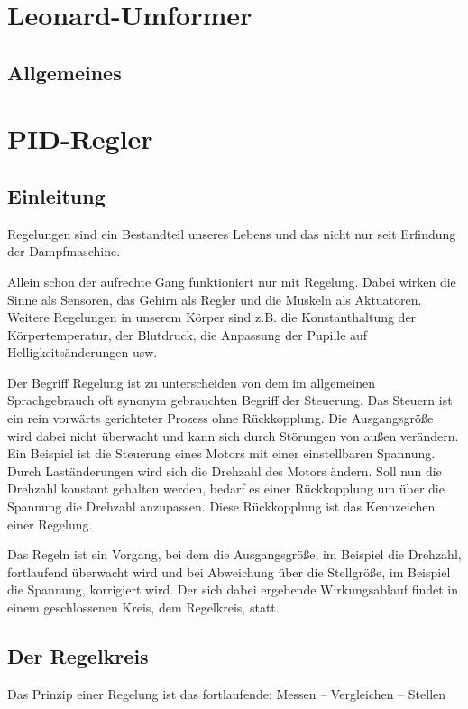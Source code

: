 \section{Leonard-Umformer}
\subsection{Allgemeines}
\subsection{ }

\newpage

\section{PID-Regler}
\subsection{Einleitung}
Regelungen sind ein Bestandteil unseres Lebens und das nicht nur seit Erfindung der Dampfmaschine.

Allein schon der aufrechte Gang funktioniert nur mit Regelung. Dabei wirken die Sinne als Sensoren, das Gehirn als Regler und die Muskeln als Aktuatoren. Weitere Regelungen in unserem Körper sind z.B. die Konstanthaltung der Körpertemperatur, der Blutdruck, die Anpassung der Pupille auf Helligkeitsänderungen usw.

Der Begriff Regelung ist zu unterscheiden von dem im allgemeinen Sprachgebrauch oft synonym gebrauchten Begriff der Steuerung. Das Steuern ist ein rein vorwärts gerichteter Prozess ohne Rückkopplung. Die Ausgangsgröße wird dabei nicht überwacht und kann sich durch Störungen von außen verändern. Ein Beispiel ist die Steuerung eines Motors mit einer einstellbaren Spannung. Durch Laständerungen wird sich die Drehzahl des Motors ändern. Soll nun die Drehzahl konstant gehalten werden, bedarf es einer Rückkopplung um über die Spannung die Drehzahl anzupassen. Diese Rückkopplung ist das Kennzeichen einer Regelung.

Das Regeln ist ein Vorgang, bei dem die Ausgangsgröße, im Beispiel die Drehzahl, fortlaufend überwacht wird und bei Abweichung über die Stellgröße, im Beispiel die Spannung, korrigiert wird. Der sich dabei ergebende Wirkungsablauf findet in einem geschlossenen Kreis, dem Regelkreis, statt.
\vspace{5mm}

\subsection{Der Regelkreis}
Das Prinzip einer Regelung ist das fortlaufende: Messen – Vergleichen – Stellen
\\[5mm]

